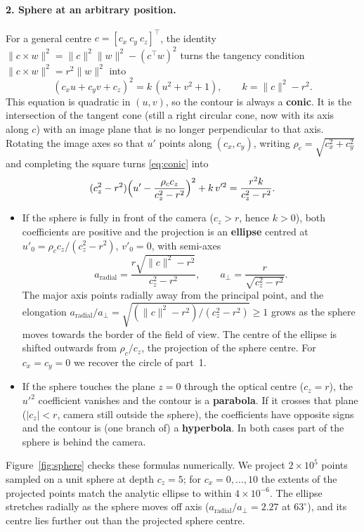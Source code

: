 \documentclass[11pt,a4paper]{article}
\begin{document}
\paragraph{2. Sphere at an arbitrary position.}
For a general centre $c=[c_x\ c_y\ c_z]^\top$, the identity
$\lVert c\times w\rVert^2=\lVert c\rVert^2\lVert w\rVert^2-(c^\top w)^2$ turns the
tangency condition $\lVert c\times w\rVert^2=r^2\lVert w\rVert^2$ into
\begin{equation}
  (c_x u+c_y v+c_z)^2=k\,(u^2+v^2+1),\qquad k=\lVert c\rVert^2-r^2 .
  \label{eq:conic}
\end{equation}
This equation is quadratic in $(u,v)$, so the contour is always a \textbf{conic}. It is
the intersection of the tangent cone (still a right circular cone, now with its axis
along $c$) with an image plane that is no longer perpendicular to that axis.
Rotating the image axes so that $u'$ points along $(c_x,c_y)$, writing
$\rho_c=\sqrt{c_x^2+c_y^2}$ and completing the square turns \eqref{eq:conic} into
\begin{equation}
  (c_z^2-r^2)\Bigl(u'-\frac{\rho_c c_z}{c_z^2-r^2}\Bigr)^2+k\,v'^2=\frac{r^2k}{c_z^2-r^2}.
\end{equation}
\begin{itemize}
  \item If the sphere is fully in front of the camera ($c_z>r$, hence $k>0$), both
    coefficients are positive and the projection is an \textbf{ellipse} centred at
    $u'_0=\rho_c c_z/(c_z^2-r^2)$, $v'_0=0$, with semi-axes
    \[a_{\text{radial}}=\frac{r\sqrt{\lVert c\rVert^2-r^2}}{c_z^2-r^2},\qquad
      a_{\perp}=\frac{r}{\sqrt{c_z^2-r^2}} .\]
    The major axis points radially away from the principal point, and the elongation
    $a_{\text{radial}}/a_\perp=\sqrt{(\lVert c\rVert^2-r^2)/(c_z^2-r^2)}\ge 1$ grows
    as the sphere moves towards the border of the field of view. The centre of the
    ellipse is shifted outwards from $\rho_c/c_z$, the projection of the sphere centre.
    For $c_x=c_y=0$ we recover the circle of part~1.
  \item If the sphere touches the plane $z=0$ through the optical centre ($c_z=r$), the
    $u'^2$ coefficient vanishes and the contour is a \textbf{parabola}. If it crosses
    that plane ($|c_z|<r$, camera still outside the sphere), the coefficients have
    opposite signs and the contour is (one branch of) a \textbf{hyperbola}. In both
    cases part of the sphere is behind the camera.
\end{itemize}

Figure~\ref{fig:sphere} checks these formulas numerically. We project $2\times10^5$
points sampled on a unit sphere at depth $c_z=5$; for $c_x=0,\dots,10$ the extents of the
projected points match the analytic ellipse to within $4\times10^{-6}$. The ellipse
stretches radially as the sphere moves off axis ($a_{\text{radial}}/a_\perp=2.27$ at
$63^\circ$), and its centre lies further out than the projected sphere centre.
\end{document}

